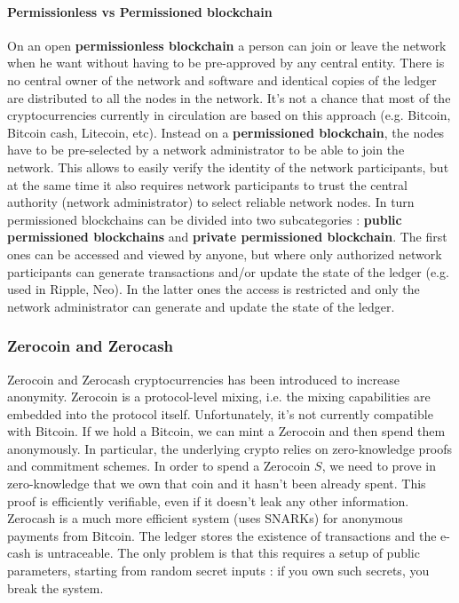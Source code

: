 \paragraph{Permissionless vs Permissioned blockchain} On an open \textbf{permissionless blockchain} a person can join or leave the network when he want without having to be pre-approved by any central entity. There is no central owner of the network and software and identical copies of the ledger are distributed to all the nodes in the network. It's not a chance that most of the cryptocurrencies currently in circulation are based on this approach (e.g. Bitcoin, Bitcoin cash, Litecoin, etc). Instead on a \textbf{permissioned blockchain}, the nodes have to be pre-selected by a network administrator to be able to join the network. This allows to easily verify the identity of the network participants, but at the same time it also requires network participants to trust the central authority (network administrator) to select reliable network nodes. In turn permissioned blockchains can be divided into two subcategories : \textbf{public permissioned blockchains} and \textbf{private permissioned blockchain}. The first ones can be accessed and viewed by anyone, but where only authorized network participants can generate transactions and/or update the state of the ledger (e.g. used in Ripple, Neo). In the latter ones the access is restricted and only the network administrator can generate and update the state of the ledger.

\subsubsection{Zerocoin and Zerocash}
Zerocoin and Zerocash cryptocurrencies has been introduced to increase anonymity. Zerocoin is a protocol-level mixing, i.e. the mixing capabilities are embedded into the protocol itself. Unfortunately, it's not currently compatible with Bitcoin. If we hold a Bitcoin, we can mint a Zerocoin and then spend them anonymously. In particular, the underlying crypto relies on zero-knowledge proofs and commitment schemes. In order to spend a Zerocoin $S$, we need to prove in zero-knowledge that we own that coin and it hasn't been already spent. This proof is efficiently verifiable, even if it doesn't leak any other information. Zerocash is a much more efficient system (uses SNARKs) for anonymous payments from Bitcoin. The ledger stores the existence of transactions and the e-cash is untraceable. The only problem is that this requires a setup of public parameters, starting from random secret inputs : if you own such secrets, you break the system.

